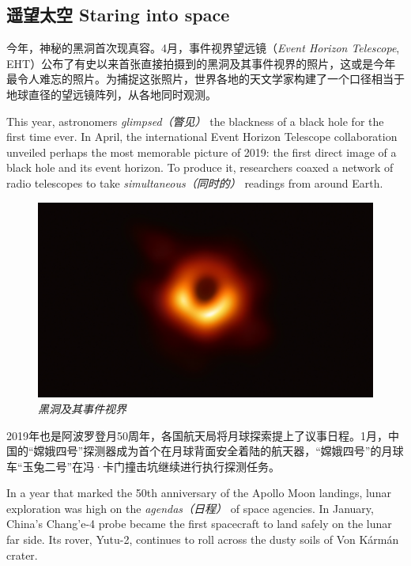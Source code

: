 \begin{multicols}{3}
\section*{遥望太空 Staring into space}

今年，神秘的黑洞首次现真容。4月，事件视界望远镜（\textit{Event Horizon Telescope}, EHT）公布了有史以来首张直接拍摄到的黑洞及其事件视界的照片，这或是今年最令人难忘的照片。为捕捉这张照片，世界各地的天文学家构建了一个口径相当于地球直径的望远镜阵列，从各地同时观测。

This year, astronomers \textit{glimpsed（瞥见）} the blackness of a black hole for the first time ever. In April, the international Event Horizon Telescope collaboration unveiled perhaps the most memorable picture of 2019: the first direct image of a black hole and its event horizon. To produce it, researchers coaxed a network of radio telescopes to take \textit{simultaneous（同时的）} readings from around Earth.

\begin{figure}[H]
    \centering
    \includegraphics[width=\linewidth]{IMG/202001/eso1907a.jpg}
    \caption{\textit{黑洞及其事件视界}}
    \label{fig:my_label}
\end{figure}


2019年也是阿波罗登月50周年，各国航天局将月球探索提上了议事日程。1月，中国的“嫦娥四号”探测器成为首个在月球背面安全着陆的航天器，“嫦娥四号”的月球车“玉兔二号”在冯·卡门撞击坑继续进行执行探测任务。

In a year that marked the 50th anniversary of the Apollo Moon landings, lunar exploration was high on the \textit{agendas（日程）} of space agencies. In January, China's Chang'e-4 probe became the first spacecraft to land safely on the lunar far side. Its rover, Yutu-2, continues to roll across the dusty soils of Von Kármán crater. 


\end{multicols}
